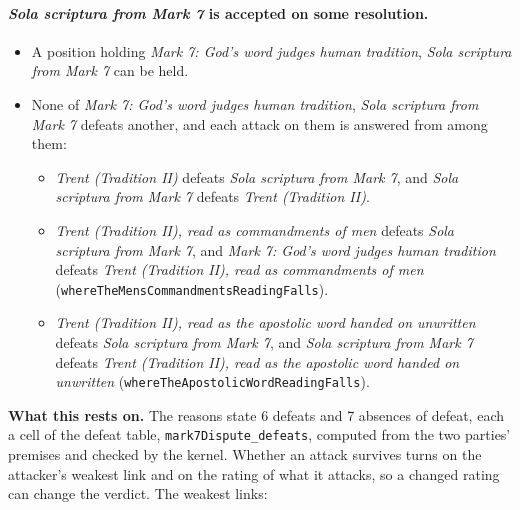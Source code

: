 \documentclass[11pt]{article}
\begin{document}
\paragraph{\emph{Sola scriptura from Mark 7} is accepted on some resolution.}
\begin{itemize}
\item A position holding \emph{Mark 7: God's word judges human tradition}, \emph{Sola scriptura from Mark 7} can be held.
\item None of \emph{Mark 7: God's word judges human tradition}, \emph{Sola scriptura from Mark 7} defeats another, and each attack on them is answered from among them:
\begin{itemize}
\item \emph{Trent (Tradition II)} defeats \emph{Sola scriptura from Mark 7}, and \emph{Sola scriptura from Mark 7} defeats \emph{Trent (Tradition II)}.
\item \emph{Trent (Tradition II), read as commandments of men} defeats \emph{Sola scriptura from Mark 7}, and \emph{Mark 7: God's word judges human tradition} defeats \emph{Trent (Tradition II), read as commandments of men} (\texttt{where\allowbreak{}The\allowbreak{}Mens\allowbreak{}Commandments\allowbreak{}Reading\allowbreak{}Falls}).
\item \emph{Trent (Tradition II), read as the apostolic word handed on unwritten} defeats \emph{Sola scriptura from Mark 7}, and \emph{Sola scriptura from Mark 7} defeats \emph{Trent (Tradition II), read as the apostolic word handed on unwritten} (\texttt{where\allowbreak{}The\allowbreak{}Apostolic\allowbreak{}Word\allowbreak{}Reading\allowbreak{}Falls}).
\end{itemize}
\end{itemize}
\par\noindent\textbf{What this rests on.} The reasons state 6 defeats and 7 absences of defeat, each a cell of the defeat table, \texttt{mark7\allowbreak{}Dispute\_\allowbreak{}defeats}, computed from the two parties' premises and checked by the kernel. Whether an attack survives turns on the attacker's weakest link and on the rating of what it attacks, so a changed rating can change the verdict. The weakest links:
\end{document}
